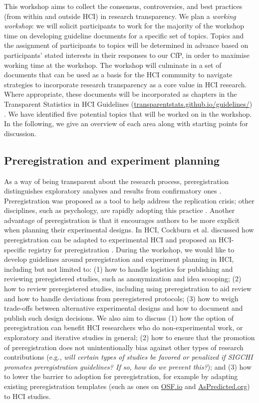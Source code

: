 \documentclass[sigchi-a, authorversion]{acmart}
\begin{document}
This workshop aims to collect the consensus, controversies, and best practices (from within and outside HCI) in research transparency. We plan a \emph{working workshop}: we will solicit participants to work for the majority of the workshop time on developing guideline documents for a specific set of topics. Topics and the assignment of participants to topics will be determined in advance based on participants' stated interests in their responses to our CfP, in order to maximise working time at the workshop. The workshop will culminate in a set of documents that can be used as a basis for the HCI community to navigate strategies to incorporate research transparency as a core value in HCI research. Where appropriate, these documents will be incorporated as chapters in the Transparent Statistics in HCI Guidelines  (\url{transparentstats.github.io/guidelines/}) \cite{TransparentStats2018}. We have identified five potential topics that will be worked on in the workshop. In the following, we give an overview of each area along with starting points for discussion.


\subsection{Preregistration and experiment planning}
As a way of being transparent about the research process, preregistration distinguishes exploratory analyses and results from confirmatory ones \cite{Nosek2018}. Preregistration was proposed as a tool to help address the replication crisis; other disciplines, such as psychology, are rapidly adopting this practice \cite{Kupferschmidt1192}. Another advantage of preregistration is that it encourages authors to be more explicit when planning their experimental designs. In HCI, Cockburn et al. discussed how preregistration can be adapted to experimental HCI and proposed an HCI-specific registry for preregistration \cite{Cockburn2018}. During the workshop, we would like to develop guidelines around preregistration and experiment planning in HCI, including but not limited to: (1) how to handle logistics for publishing and reviewing preregistered studies, such as anonymization and idea scooping; (2) how to review preregistered studies, including using preregistration to aid review and how to handle deviations from preregistered protocols; (3) how to weigh trade-offs between alternative experimental designs and how to document and publish such design decisions. We also aim to discuss (1) how the option of preregistration can benefit HCI researchers who do non-experimental work, or exploratory and iterative studies in general; (2) how to ensure that the promotion of preregistration does not unintentionally bias against other types of research contributions (e.g., \emph{will certain types of studies be favored or penalized if SIGCHI promotes preregistration guidelines? If so, how do we prevent this?}); and (3) how to lower the barrier to adoption for preregistration, for example by adapting existing preregistration templates (such as ones on \href{http://osf.io}{OSF.io} and \href{http://aspredicted.org}{AsPredicted.org}) to HCI studies.
\end{document}

